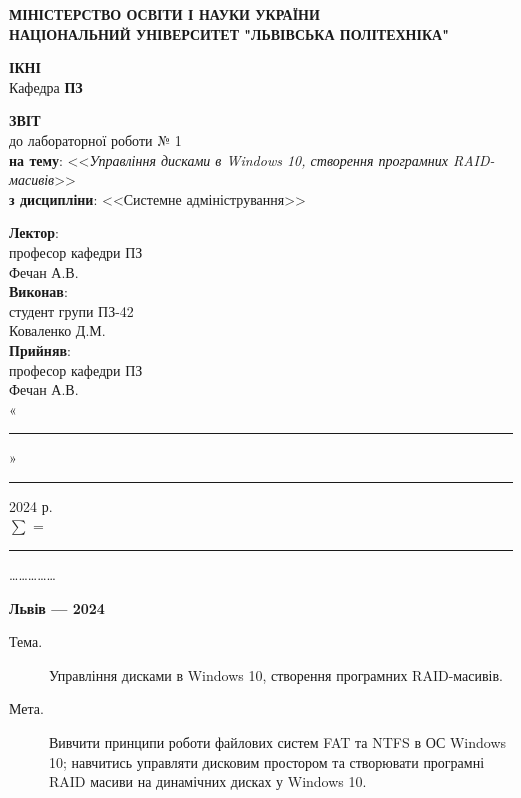 \documentclass[oneside,14pt]{extarticle}
\newcommand\subject{Системне адміністрування}
\newcommand\lecturer{професор кафедри ПЗ\\Фечан А.В.}
\newcommand\teacher{професор кафедри ПЗ\\Фечан А.В.}
\newcommand\mygroup{ПЗ-42}
\newcommand\lab{1}
\newcommand\theme{Управління дисками в Windows 10, створення програмних
	RAID-масивів}
\newcommand\purpose{Вивчити принципи роботи файлових систем FAT та NTFS в
	ОС Windows 10; навчитись управляти дисковим простором та створювати
	програмні RAID масиви на динамічних дисках у Windows 10}
\begin{document}
\begin{normalsize}
	\begin{titlepage}
		\thispagestyle{empty}
		\begin{center}
			\textbf{МІНІСТЕРСТВО ОСВІТИ І НАУКИ УКРАЇНИ\\
				НАЦІОНАЛЬНИЙ УНІВЕРСИТЕТ "ЛЬВІВСЬКА ПОЛІТЕХНІКА"}
		\end{center}
		\begin{flushright}
			\textbf{ІКНІ}\\
			Кафедра \textbf{ПЗ}
		\end{flushright}
		\vspace{80pt}
		\begin{center}
			\textbf{ЗВІТ}\\
			\vspace{10pt}
			до лабораторної роботи № \lab\\
			\textbf{на тему}: <<\textit{\theme}>>\\
			\textbf{з дисципліни}: <<\subject>>
		\end{center}
		\vspace{80pt}
		\begin{flushright}
			
			\textbf{Лектор}:\\
			\lecturer\\
			\vspace{28pt}
			\textbf{Виконав}:\\
			
			студент групи \mygroup\\
			Коваленко Д.М.\\
			\vspace{28pt}
			\textbf{Прийняв}:\\
			
			\teacher\\
			
			\vspace{28pt}
			«\rule{1cm}{0.15mm}» \rule{1.5cm}{0.15mm} 2024 р.\\
			$\sum$ = \rule{1cm}{0.15mm}……………\\
			
		\end{flushright}
		\vspace{\fill}
		\begin{center}
			\textbf{Львів — 2024}
		\end{center}
	\end{titlepage}
		
	\begin{description}
		\item[Тема.] \theme.
		\item[Мета.] \purpose.
	\end{description}


\end{normalsize}
\end{document}
